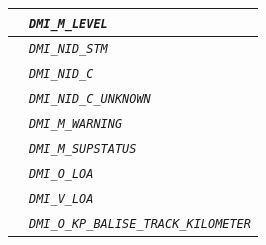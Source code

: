 \begin{itemize}
\begin{longtable}{|l|l|}
				\hline

				&	\begin{minipage}[t]{0.78\linewidth} \emph{\texttt{DMI\_M\_LEVEL}} \end{minipage} \\

				\hline

				&	\begin{minipage}[t]{0.78\linewidth} \emph{\texttt{DMI\_NID\_STM}} \end{minipage} \\

				\hline

				&	\begin{minipage}[t]{0.78\linewidth} \emph{\texttt{DMI\_NID\_C}} \end{minipage} \\

				\hline

				&	\begin{minipage}[t]{0.78\linewidth} \emph{\texttt{DMI\_NID\_C\_UNKNOWN}} \end{minipage} \\

				\hline

				&	\begin{minipage}[t]{0.78\linewidth} \emph{\texttt{DMI\_M\_WARNING}} \end{minipage} \\

				\hline

				&	\begin{minipage}[t]{0.78\linewidth} \emph{\texttt{DMI\_M\_SUPSTATUS}} \end{minipage} \\

				\hline

				&	\begin{minipage}[t]{0.78\linewidth} \emph{\texttt{DMI\_O\_LOA}} \end{minipage} \\

				\hline

				&	\begin{minipage}[t]{0.78\linewidth} \emph{\texttt{DMI\_V\_LOA}} \end{minipage} \\

				\hline

				&	\begin{minipage}[t]{0.78\linewidth} \emph{\texttt{DMI\_O\_KP\_BALISE\_TRACK\_KILOMETER}} \end{minipage} \\


\end{longtable}
\end{itemize}
